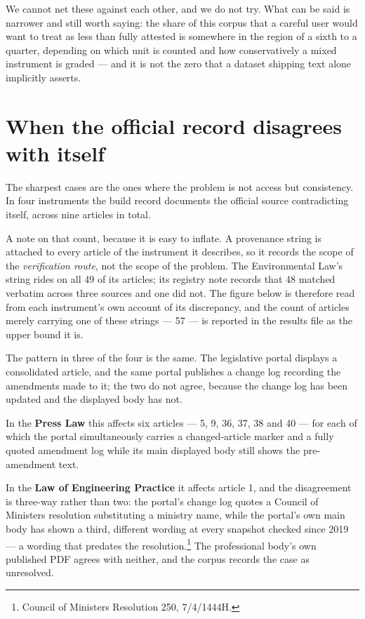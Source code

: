 \documentclass[11pt]{article}
\begin{document}
We cannot net these against each other, and we do not try. What can be said is
narrower and still worth saying: the share of this corpus that a careful user
would want to treat as less than fully attested is somewhere in the region of a
sixth to a quarter, depending on which unit is counted and how conservatively a
mixed instrument is graded --- and it is not the zero that a dataset shipping
text alone implicitly asserts.

\section{When the official record disagrees with itself}
\label{sec:contradiction}

The sharpest cases are the ones where the problem is not access but
consistency. In four instruments the build record documents the official source
contradicting itself, across nine articles in total.

A note on that count, because it is easy to inflate. A provenance string is
attached to every article of the instrument it describes, so it records the
scope of the \emph{verification route}, not the scope of the problem. The
Environmental Law's string rides on all 49 of its articles; its registry note
records that 48 matched verbatim across three sources and one did not. The
figure below is therefore read from each instrument's own account of its
discrepancy, and the count of articles merely carrying one of these strings ---
57 --- is reported in the results file as the upper bound it is.

The pattern in three of the four is the same. The legislative portal displays a
consolidated article, and the same portal publishes a change log recording the
amendments made to it; the two do not agree, because the change log has been
updated and the displayed body has not.

In the \textbf{Press Law} this affects six articles --- 5, 9, 36, 37, 38 and 40
--- for each of which the portal simultaneously carries a changed-article marker
and a fully quoted amendment log while its main displayed body still shows the
pre-amendment text.

In the \textbf{Law of Engineering Practice} it affects article 1, and the
disagreement is three-way rather than two: the portal's change log quotes a
Council of Ministers resolution substituting a ministry name, while the
portal's own main body has shown a third, different wording at every snapshot
checked since 2019 --- a wording that predates the resolution.\footnote{Council
of Ministers Resolution 250, 7/4/1444H.} The professional body's own published
PDF agrees with neither, and the corpus records the case as unresolved.
\end{document}
